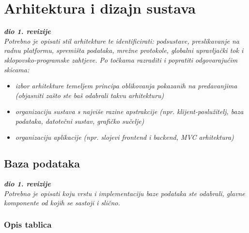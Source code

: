 \chapter{Arhitektura i dizajn sustava}
		
		\textbf{\textit{dio 1. revizije}}\\

		\textit{ Potrebno je opisati stil arhitekture te identificirati: podsustave, preslikavanje na radnu platformu, spremišta podataka, mrežne protokole, globalni upravljački tok i sklopovsko-programske zahtjeve. Po točkama razraditi i popratiti odgovarajućim skicama:}
	\begin{itemize}
		\item 	\textit{izbor arhitekture temeljem principa oblikovanja pokazanih na predavanjima (objasniti zašto ste baš odabrali takvu arhitekturu)}
		\item 	\textit{organizaciju sustava s najviše razine apstrakcije (npr. klijent-poslužitelj, baza podataka, datotečni sustav, grafičko sučelje)}
		\item 	\textit{organizaciju aplikacije (npr. slojevi frontend i backend, MVC arhitektura) }		
	\end{itemize}

	
		

		

				
		\section{Baza podataka}
			
			\textbf{\textit{dio 1. revizije}}\\
			
		\textit{Potrebno je opisati koju vrstu i implementaciju baze podataka ste odabrali, glavne komponente od kojih se sastoji i slično.}
		
			\subsection{Opis tablica}
			

				
				
